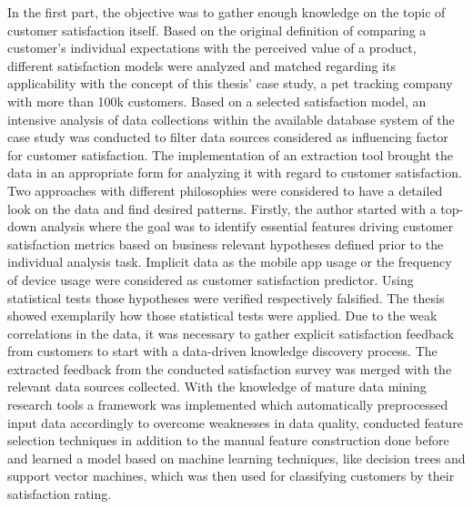 In the first part, the objective was to gather enough knowledge on the topic of customer satisfaction itself. Based on the original definition of comparing a customer's individual expectations with the perceived value of a product, different satisfaction models were analyzed and matched regarding its applicability with the concept of this thesis' case study, a pet tracking company with more than 100k customers. Based on a selected satisfaction model, an intensive analysis of data collections within the available database system of the case study was conducted to filter data sources considered as influencing factor for customer satisfaction. The implementation of an extraction tool brought the data in an appropriate form for analyzing it with regard to customer satisfaction. Two approaches with different philosophies were considered to have a detailed look on the data and find desired patterns. Firstly, the author started with a top-down analysis where the goal was to identify essential features driving customer satisfaction metrics based on business relevant hypotheses defined prior to the individual analysis task. Implicit data as the mobile app usage or the frequency of device usage were considered as customer satisfaction predictor. Using statistical tests those hypotheses were verified respectively falsified. The thesis showed exemplarily how those statistical tests were applied. Due to the weak correlations in the data, it was necessary to gather explicit satisfaction feedback from customers to start with a data-driven knowledge discovery process. The extracted feedback from the conducted satisfaction survey was merged with the relevant data sources collected. With the knowledge of mature data mining research tools a framework was implemented which automatically preprocessed input data accordingly to overcome weaknesses in data quality, conducted feature selection techniques in addition to the manual feature construction done before and learned a model based on machine learning techniques, like decision trees and support vector machines, which was then used for classifying customers by their satisfaction rating. 

